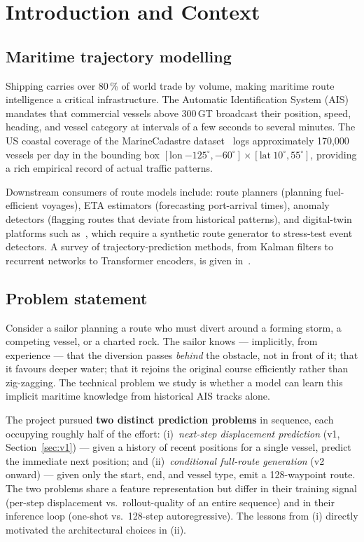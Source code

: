\documentclass[11pt,a4paper]{article}
\begin{document}
\tableofcontents
\newpage

\section{Introduction and Context}
\label{sec:intro}

\subsection{Maritime trajectory modelling}

Shipping carries over 80\,\% of world trade by volume, making maritime
route intelligence a critical infrastructure.
The Automatic Identification System (AIS) mandates that commercial vessels above
300\,GT broadcast their position, speed, heading, and vessel category
at intervals of a few seconds to several minutes.
The US coastal coverage of the MarineCadastre dataset~\cite{noaa2024ais}
logs approximately 170,000 vessels per day in the bounding box
$[\text{lon}\ {-125^\circ},{-60^\circ}] \times [\text{lat}\ 10^\circ, 55^\circ]$,
providing a rich empirical record of actual traffic patterns.

Downstream consumers of route models include: route planners (planning fuel-efficient
voyages), ETA estimators (forecasting port-arrival times), anomaly detectors
(flagging routes that deviate from historical patterns), and digital-twin platforms
such as~\citet{grigoropoulos2024scalable}, which require a synthetic route generator
to stress-test event detectors.
A survey of trajectory-prediction methods, from Kalman filters to recurrent networks
to Transformer encoders, is given in~\citet{li2023trajectory}.

\subsection{Problem statement}

Consider a sailor planning a route who must divert around a forming storm, a
competing vessel, or a charted rock. The sailor knows --- implicitly, from
experience --- that the diversion passes \emph{behind} the obstacle, not in
front of it; that it favours deeper water; that it rejoins the original course
efficiently rather than zig-zagging.
The technical problem we study is whether a model can learn this implicit
maritime knowledge from historical AIS tracks alone.

The project pursued \textbf{two distinct prediction problems} in sequence,
each occupying roughly half of the effort:
(i)~\emph{next-step displacement prediction} (v1, Section~\ref{sec:v1}) ---
given a history of recent positions for a single vessel, predict the
immediate next position; and
(ii)~\emph{conditional full-route generation} (v2 onward) --- given only the
start, end, and vessel type, emit a 128-waypoint route.
The two problems share a feature representation but differ in their training
signal (per-step displacement vs.\ rollout-quality of an entire sequence)
and in their inference loop (one-shot vs.\ 128-step autoregressive).
The lessons from (i) directly motivated the architectural choices in (ii).
\end{document}
